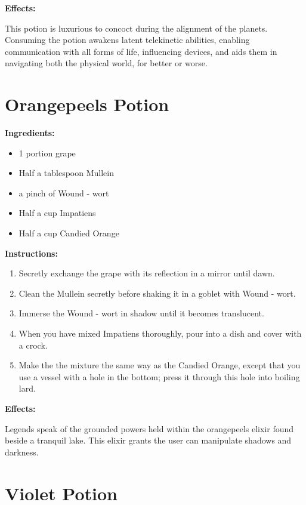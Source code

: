 \documentclass{article}
\begin{document}
\textbf{Effects:}

This potion is luxurious to concoct during the alignment of the planets. Consuming the potion awakens latent telekinetic abilities, enabling communication with all forms of life, influencing devices, and aids them in navigating both the physical world, for better or worse.

\newpage
\section*{Orangepeels Potion}

\textbf{Ingredients:}

\begin{itemize}
  \item 1 portion grape
  \item Half a tablespoon Mullein
  \item a pinch of Wound - wort
  \item Half a cup Impatiens
  \item Half a cup Candied Orange
\end{itemize}

\textbf{Instructions:}

\begin{enumerate}
  \item Secretly exchange the grape with its reflection in a mirror until dawn.
  \item Clean the Mullein secretly before shaking it in a goblet with Wound - wort.
  \item Immerse the Wound - wort in shadow until it becomes translucent.
  \item When you have mixed Impatiens thoroughly, pour into a dish and cover with a crock.
  \item Make the the mixture the same way as the Candied Orange, except that you use a vessel with a hole in the bottom; press it through this hole into boiling lard.
\end{enumerate}

\textbf{Effects:}

Legends speak of the grounded powers held within the orangepeels elixir found beside a tranquil lake. This elixir grants the user can manipulate shadows and darkness.

\newpage
\section*{Violet Potion}
\end{document}

